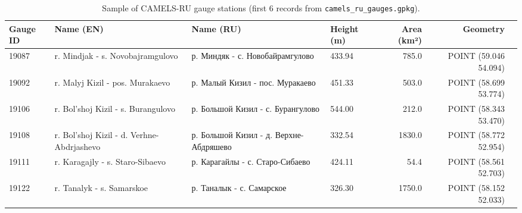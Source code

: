 \begin{table}[htbp]
\centering
\caption{Sample of CAMELS-RU gauge stations (first 6 records from \texttt{camels\_ru\_gauges.gpkg}).}
\label{tab:gauges_sample}
\small
\begin{tabular}{llp{4cm}p{3cm}rrl}
\toprule
\textbf{Gauge ID} & \textbf{Name (EN)} & \textbf{Name (RU)} & \textbf{Height (m)} & \textbf{Area (km²)} & \textbf{Geometry} \\
\midrule
19087 & r. Mindjak - s. Novobajramgulovo & р. Миндяк - с. Новобайрамгулово & 433.94 & 785.0 & POINT (59.046 54.094) \\
19092 & r. Malyj Kizil - pos. Murakaevo & р. Малый Кизил - пос. Муракаево & 451.33 & 503.0 & POINT (58.699 53.774) \\
19106 & r. Bol'shoj Kizil - s. Burangulovo & р. Большой Кизил - с. Бурангулово & 544.00 & 212.0 & POINT (58.343 53.470) \\
19108 & r. Bol'shoj Kizil - d. Verhne-Abdrjashevo & р. Большой Кизил - д. Верхне-Абдряшево & 332.54 & 1830.0 & POINT (58.772 52.954) \\
19111 & r. Karagajly - s. Staro-Sibaevo & р. Карагайлы - с. Старо-Сибаево & 424.11 & 54.4 & POINT (58.561 52.703) \\
19122 & r. Tanalyk - s. Samarskoe & р. Таналык - с. Самарское & 326.30 & 1750.0 & POINT (58.152 52.033) \\
\bottomrule
\end{tabular}
\end{table}
